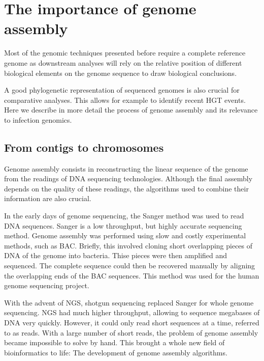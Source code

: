 
\chapter{The importance of genome assembly} %

\label{ch:01-03} %

Most of the genomic techniques presented before require a complete reference genome as downstream analyses will rely on the relative position of different biological elements on the genome sequence to draw biological conclusions. 

A good phylogenetic representation of sequenced genomes is also crucial for comparative analyses. This allows for example to  identify recent \acrshort{HGT} events. Here we describe in more detail the process of genome assembly and its relevance to infection genomics.

\section{From contigs to chromosomes}
Genome assembly consists in reconstructing the linear sequence of the genome from the readings of DNA sequencing technologies. Although the final assembly depends on the quality of these readings, the algorithms used to combine their information are also crucial.

In the early days of genome sequencing, the Sanger method was used to read DNA sequences. Sanger is a low throughput, but highly accurate sequencing method. Genome assembly was performed using slow and costly experimental methods, such as \acrfull{BAC}. Briefly, this involved cloning short overlapping pieces of DNA of the genome into bacteria. Thise pieces were then amplified and sequenced. The complete sequence could then be recovered manually by aligning the overlapping ends of the \acrshort{BAC} sequences. This method was used for the human genome sequencing project.

With the advent of \acrfull{NGS}, shotgun sequencing replaced Sanger for whole genome sequencing. \acrshort{NGS} had much higher throughput, allowing to sequence megabases of DNA very quickly. However, it could only read short sequences at a time, referred to as \Gls{read}s. With a large number of short reads, the problem of genome assembly became impossible to solve by hand. This brought a whole new field of bioinformatics to life: The development of genome assembly algorithms.

